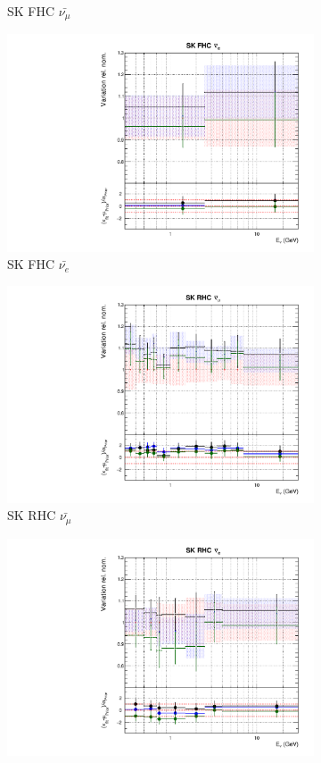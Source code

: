 \begin{figure}
\begin{subfigure}{0.24\textwidth}
  \caption{SK FHC $\bar{\nu_{\mu}}$}
\end{subfigure}
\begin{subfigure}{0.24\textwidth}
  \centering
  \includegraphics[width=0.95\linewidth]{figs/fhcrhcfitsflux_11}
  \caption{SK FHC $\bar{\nu_{e}}$}
\end{subfigure}
\begin{subfigure}{0.24\textwidth}
  \centering
  \includegraphics[width=0.95\linewidth]{figs/fhcrhcfitsflux_12}
  \caption{SK RHC $\bar{\nu_{\mu}}$}
\end{subfigure}
\begin{subfigure}{0.24\textwidth}
  \centering
  \includegraphics[width=0.95\linewidth]{figs/fhcrhcfitsflux_13}

\end{subfigure}
\end{figure}
